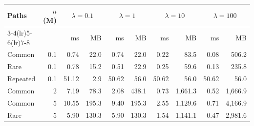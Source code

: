 \begin{tabular}{lrrrrrrrrr}
\toprule
Paths & $n$ (M) & \multicolumn{2}{c}{$\lambda=0.1$} & \multicolumn{2}{c}{$\lambda=1$} & \multicolumn{2}{c}{$\lambda=10$} & \multicolumn{2}{c}{$\lambda=100$}\\
\cmidrule(lr){3-4}\cmidrule(lr){5-6}\cmidrule(lr){7-8}
 &  & ms & MB & ms & MB & ms & MB & ms & MB\\
\midrule
Common & 0.1 & 0.74 & 22.0 & 0.74 & 22.0 & 0.22 & 83.5 & 0.08 & 506.2\\
Rare & 0.1 & 0.78 & 15.2 & 0.51 & 22.9 & 0.25 & 59.6 & 0.13 & 235.8\\
Repeated & 0.1 & 51.12 & 2.9 & 50.62 & 56.0 & 50.62 & 56.0 & 50.62 & 56.0\\
Common & 2 & 7.19 & 78.3 & 2.08 & 438.1 & 0.73 & 1{,}661.3 & 0.52 & 1{,}666.9\\
Common & 5 & 10.55 & 195.3 & 9.40 & 195.3 & 2.55 & 1{,}129.6 & 0.71 & 4{,}166.9\\
Rare & 5 & 5.90 & 130.3 & 5.90 & 130.3 & 1.54 & 1{,}141.1 & 0.47 & 2{,}981.6\\
\bottomrule
\end{tabular}
